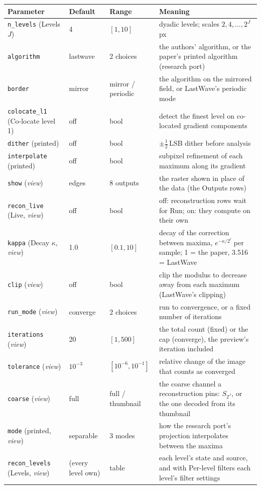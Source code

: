 \documentclass[10pt]{article}
\begin{document}
\begin{longtable}{L l l M}
\toprule Parameter & Default & Range & Meaning \\ \midrule
\texttt{n\_levels} (Levels $J$) & 4 & $[1,10]$ & dyadic levels; scales $2,4,\dots,2^{J}$ px \\
\texttt{algorithm} & lastwave & 2 choices & the authors' algorithm, or the paper's printed algorithm (research port) \\
\texttt{border} & mirror & mirror / periodic & the algorithm on the mirrored field, or LastWave's periodic mode \\
\texttt{colocate\_l1} (Co-locate level 1) & off & bool & detect the finest level on co-located gradient components \\
\texttt{dither} (printed) & off & bool & $\pm\tfrac12$\,LSB dither before analysis \\
\texttt{interpolate} (printed) & off & bool & subpixel refinement of each maximum along its gradient \\
\texttt{show} (\emph{view}) & edges & 8 outputs & the raster shown in place of the data (the Outputs rows) \\
\texttt{recon\_live} (Live, \emph{view}) & off & bool & off: reconstruction rows wait for Run; on: they compute on their own \\
\texttt{kappa} (Decay $\kappa$, \emph{view}) & 1.0 & $[0.1,10]$ & decay of the correction between maxima, $e^{-\kappa/2^l}$ per sample; 1 = the paper, 3.516 = LastWave \\
\texttt{clip} (\emph{view}) & off & bool & clip the modulus to decrease away from each maximum (LastWave's clipping) \\
\texttt{run\_mode} (\emph{view}) & converge & 2 choices & run to convergence, or a fixed number of iterations \\
\texttt{iterations} (\emph{view}) & 20 & $[1,500]$ & the total count (fixed) or the cap (converge), the preview's iteration included \\
\texttt{tolerance} (\emph{view}) & $10^{-3}$ & $[10^{-6},10^{-1}]$ & relative change of the image that counts as converged \\
\texttt{coarse} (\emph{view}) & full & full / thumbnail & the coarse channel a reconstruction pins: $S_{2^J}$, or the one decoded from its thumbnail \\
\texttt{mode} (printed, \emph{view}) & separable & 3 modes & how the research port's projection interpolates between the maxima \\
\texttt{recon\_levels} (Levels, \emph{view}) & (every level own) & table & each level's state and source, and with Per-level filters each level's filter settings \\

\end{longtable}
\end{document}
